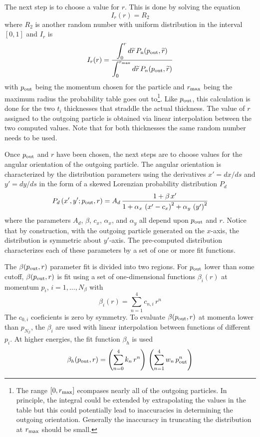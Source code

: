 The next step is to choose a value for $r$. This is done by solving the equation
\begin{equation}
  I_r(r) = R_2
\end{equation}
where $R_2$ is another random number with uniform distribution in the interval $[0,1]$ and $I_r$ is 
\begin{equation}
  I_r(r) = \frac{\displaystyle \int_0^r d{\widetilde r} \, P_{\text{n}}(p_{\text{out}}, {\widetilde r})}
  {\displaystyle \int_0^{r_{\text{max}}} d{\widetilde r} \, P_{n}(p_{\text{out}}, {\widetilde r})}
\end{equation}
with $p_{\text{out}}$ being the momentum chosen for the particle and $r_{\text{max}}$ being the maximum
radius the probability table goes out to\footnote
  {
The range $[0,r_{\text{max}}]$ ecompases nearly all of the outgoing particles. In principle, the
integral could be extended by extrapolating the values in the table but this could potentially lead
to inaccuracies in determining the outgoing orientation. Generally the inaccuracy in truncating the
distribution at $r_{\text{max}}$ should be small.
  }. 
Like $p_{\text{out}}$, this calculation is done for the two
$t_i$ thicknesses that straddle the actual thickness. The value of $r$ assigned to the outgoing
particle is obtained via linear interpolation between the two computed values. Note that for both
thicknesses the same random number needs to be used.

Once $p_{\text{out}}$ and $r$ have been chosen, the next steps are to choose values for the angular
orientation of the outgoing particle. The angular orientation is characterized by the distribution
parameters using the derivatives $x' = dx/ds$ and $y' = dy/ds$ in the form of a skewed Lorenzian
probability distribution $P_d$
\begin{equation}
  P_d\left( x', y' ; p_{\text{out}}, r \right) =
  A_d \, \frac{1 + \beta \, x'}{1 + \alpha_x \, \left( x' - c_x \right)^2 +
  \alpha_y \, \left( y' \right)^2}
  \label{pxsxs}
\end{equation}
where the parameters $A_d$, $\beta$, $c_x$, $\alpha_x$, and $\alpha_y$ all depend upon $p_{\text{out}}$
and $r$. Notice that by construction, with the outgoing particle generated on the
$x$-axis, the distribution is symmetric about $y'$-axis. The pre-computed distribution
characterizes each of these parameters by a set of one or more fit functions.

The $\beta(p_{\text{out}},r)$ parameter fit is divided into two regions. For $p_{\text{out}}$ lower than
some cutoff, $\beta(p_{\text{out}},r)$ is fit using a set of one-dimensional functions $\beta_i(r)$
at momentum $p_i$, $i = 1, \ldots, N_\beta$ with
\begin{equation}
  \beta_i(r) = \sum_{n=1}^4 c_{n,i} \, r^n
\end{equation}
The $c_{0,i}$ coeficients is zero by symmetry. To evaluate $\beta(p_{\text{out}},r)$ at momenta lower than
$p_{N_\beta}$, the $\beta_i$ are used with linear interpolation between functions of different
$p_i$. At higher energies, the fit function $\beta_h$ is used
\begin{equation}
  \beta_h(p_{\text{out}},r) = \left( \sum_{n=0}^4 k_{n} \, r^n \right) \, 
  \left( \sum_{n=1}^4 w_{n} \, p_{\text{out}}^n \right)
\end{equation}

